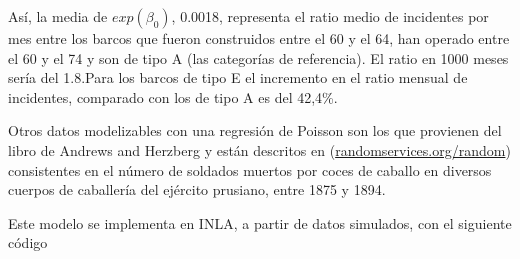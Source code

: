 \documentclass[
]{book}
\newenvironment{Shaded}{\begin{snugshade}}{\end{snugshade}}
\newcommand{\CommentTok}[1]{\textcolor[rgb]{0.56,0.35,0.01}{\textit{#1}}}
\newcommand{\DecValTok}[1]{\textcolor[rgb]{0.00,0.00,0.81}{#1}}
\newcommand{\FunctionTok}[1]{\textcolor[rgb]{0.00,0.00,0.00}{#1}}
\newcommand{\NormalTok}[1]{#1}
\newcommand{\SpecialCharTok}[1]{\textcolor[rgb]{0.00,0.00,0.00}{#1}}
\begin{document}
\begin{Shaded}
\end{Shaded}

Así, la media de \(exp(\beta_0)\), 0.0018, representa el ratio medio de incidentes por mes entre los barcos que fueron construidos entre el 60 y el 64, han operado entre el 60 y el 74 y son de tipo A (las categorías de referencia). El ratio en 1000 meses sería del 1.8.Para los barcos de tipo E el incremento en el ratio mensual de incidentes, comparado con los de tipo A es del 42,4\%.

Otros datos modelizables con una regresión de Poisson son los que provienen del libro de Andrews and Herzberg y están descritos en (\href{http://www.randomservices.org/random/data/HorseKicks.html}{randomservices.org/random}) consistentes en el número de soldados muertos por coces de caballo en diversos cuerpos de caballería del ejército prusiano, entre 1875 y 1894.

Este modelo se implementa en INLA, a partir de datos simulados, con el siguiente código
\end{document}
